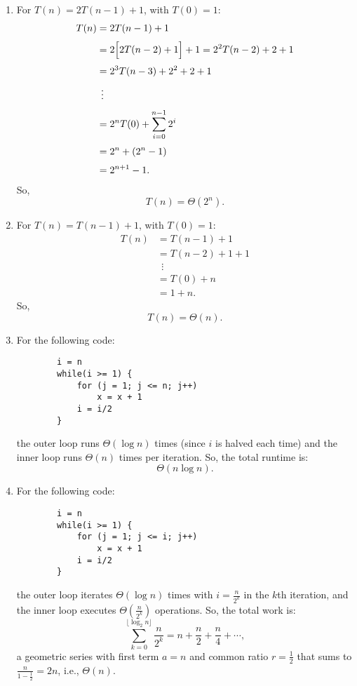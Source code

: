 \documentclass[11pt]{article}
\begin{document}
\begin{enumerate}
    \item For \(T(n) = 2T(n-1) + 1\), with \(T(0)=1\):
    \[
    \begin{aligned}
    T(n) &= 2T(n-1) + 1\\[1mm]
         &= 2\Bigl[2T(n-2) + 1\Bigr] + 1 = 2^2 T(n-2) + 2 + 1\\[1mm]
         &= 2^3 T(n-3) + 2^2 + 2 + 1\\[1mm]
         &\;\,\vdots\\[1mm]
         &= 2^nT(0) + \sum_{i=0}^{n-1} 2^i\\[1mm]
         &= 2^n + \left(2^n - 1\right)\\[1mm]
         &= 2^{n+1} - 1.
    \end{aligned}
    \]
    So, 
    \[
    T(n) = \Theta(2^n).
    \]
    
    \item For \(T(n) = T(n-1) + 1\), with \(T(0)=1\):
    \[
    \begin{aligned}
    T(n) &= T(n-1) + 1\\[1mm]
         &= T(n-2) + 1 + 1\\[1mm]
         &\;\,\vdots\\[1mm]
         &= T(0) + n\\[1mm]
         &= 1 + n.
    \end{aligned}
    \]
    So, 
    \[
    T(n) = \Theta(n).
    \]
    
    \item For the following code:
    \begin{verbatim}
        i = n
        while(i >= 1) {
            for (j = 1; j <= n; j++)
                x = x + 1
            i = i/2
        }
    \end{verbatim}
    the outer loop runs \(\Theta(\log n)\) times (since \(i\) is halved each time) and the inner loop runs \(\Theta(n)\) times per iteration. So, the total runtime is:
    \[
    \Theta(n \log n).
    \]
    
    \item For the following code:
    \begin{verbatim}
        i = n
        while(i >= 1) {
            for (j = 1; j <= i; j++)
                x = x + 1
            i = i/2
        }
    \end{verbatim}
the outer loop iterates \(\Theta(\log n)\) times with \(i = \frac{n}{2^k}\) in the \(k\)th iteration, and the inner loop executes \(\Theta\left(\frac{n}{2^k}\right)\) operations. So, the total work is:
\[
\sum_{k=0}^{\lfloor \log_2 n \rfloor} \frac{n}{2^k} = n + \frac{n}{2} + \frac{n}{4} + \cdots,
\]
a geometric series with first term \(a=n\) and common ratio \(r=\frac{1}{2}\) that sums to \(\frac{n}{1-\frac{1}{2}} = 2n\), i.e., \(\Theta(n)\).
\end{enumerate}
\end{document}
